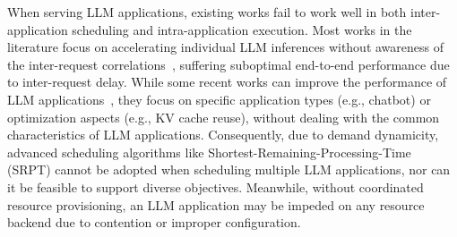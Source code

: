 
When serving LLM applications, existing works fail to work well in both inter-application scheduling and intra-application execution.
Most works in the literature focus on accelerating individual LLM inferences without awareness of the inter-request correlations~\cite{cai2024medusa,kim2023squeezellm,miao2023specinfer,frantar2022gptq,dao2022flashattention}, suffering suboptimal end-to-end performance due to inter-request delay. 
While some recent works can improve the performance of LLM applications~\cite{lin2024parrot,tan2024teola,liu2024andes,gao2024cost}, they focus on specific application types (e.g., chatbot) or optimization aspects (e.g., KV cache reuse), without dealing with the common characteristics of LLM applications.
Consequently, due to demand dynamicity, advanced scheduling algorithms like Shortest-Remaining-Processing-Time (SRPT) cannot be adopted when scheduling multiple LLM applications, nor can it be feasible to support diverse objectives. 
Meanwhile, without coordinated resource provisioning, an LLM application may be impeded on any resource backend due to contention or improper configuration. 



